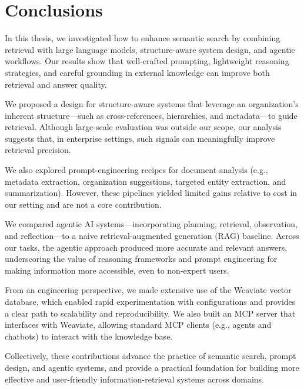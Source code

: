 \cleardoublepage%
\label{chap:conclusion}%


\section{Conclusions}
In this thesis, we investigated how to enhance semantic search by combining retrieval with large language models, structure-aware system design, and agentic workflows. Our results show that well-crafted prompting, lightweight reasoning strategies, and careful grounding in external knowledge can improve both retrieval and answer quality.

We proposed a design for structure-aware systems that leverage an organization's inherent structure—such as cross-references, hierarchies, and metadata—to guide retrieval. Although large-scale evaluation was outside our scope, our analysis suggests that, in enterprise settings, such signals can meaningfully improve retrieval precision.

We also explored prompt-engineering recipes for document analysis (e.g., metadata extraction, organization suggestions, targeted entity extraction, and summarization). However, these pipelines yielded limited gains relative to cost in our setting and are not a core contribution.

We compared agentic AI systems—incorporating planning, retrieval, observation, and reflection—to a naive retrieval-augmented generation (RAG) baseline. Across our tasks, the agentic approach produced more accurate and relevant answers, underscoring the value of reasoning frameworks and prompt engineering for making information more accessible, even to non-expert users.

From an engineering perspective, we made extensive use of the Weaviate vector database, which enabled rapid experimentation with configurations and provides a clear path to scalability and reproducibility. We also built an MCP server that interfaces with Weaviate, allowing standard MCP clients (e.g., agents and chatbots) to interact with the knowledge base.

Collectively, these contributions advance the practice of semantic search, prompt design, and agentic systems, and provide a practical foundation for building more effective and user-friendly information-retrieval systems across domains.
